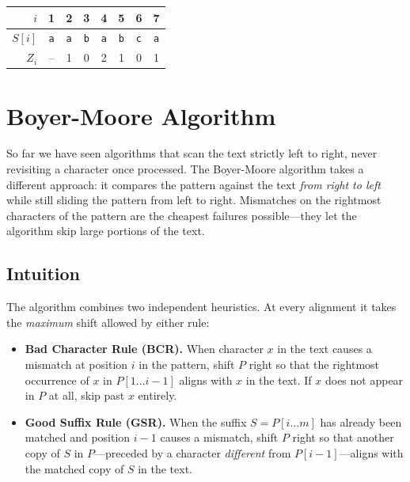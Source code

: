\begin{center}
\begin{tabular}{rccccccc}
  \toprule
  $i$    & 1 & 2 & 3 & 4 & 5 & 6 & 7 \\
  \midrule
  $S[i]$ & \texttt{a} & \texttt{a} & \texttt{b} & \texttt{a} & \texttt{b} & \texttt{c} & \texttt{a} \\
  $Z_i$  & -- & 1 & 0 & 2 & 1 & 0 & 1 \\
  \bottomrule
\end{tabular}
\end{center}


\section{Boyer-Moore Algorithm}

So far we have seen algorithms that scan the text strictly left to right,
never revisiting a character once processed.
The Boyer-Moore algorithm takes a different approach: it compares the
pattern against the text \emph{from right to left} while still sliding the
pattern from left to right.
Mismatches on the rightmost characters of the pattern are the cheapest
failures possible—they let the algorithm skip large portions of the text.


\subsection{Intuition}

The algorithm combines two independent heuristics.
At every alignment it takes the \emph{maximum} shift allowed by either rule:

\begin{itemize}
  \item \textbf{Bad Character Rule (BCR).}
        When character $x$ in the text causes a mismatch at position $i$ in
        the pattern, shift $P$ right so that the rightmost occurrence of $x$
        in $P[1\ldots i{-}1]$ aligns with $x$ in the text.
        If $x$ does not appear in $P$ at all, skip past $x$ entirely.

  \item \textbf{Good Suffix Rule (GSR).}
        When the suffix $S = P[i\ldots m]$ has already been matched and
        position $i{-}1$ causes a mismatch, shift $P$ right so that another
        copy of $S$ in $P$—preceded by a character \emph{different} from
        $P[i{-}1]$—aligns with the matched copy of $S$ in the text.
\end{itemize}

